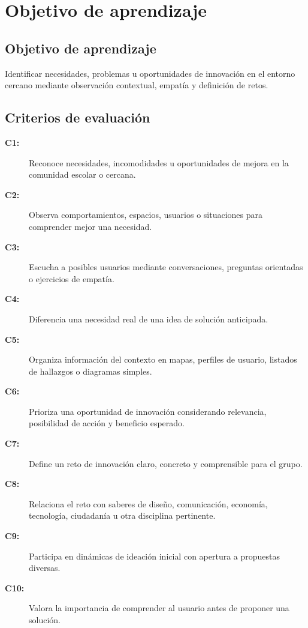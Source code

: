 \documentclass[12pt,a4paper]{article}
\newcommand{\criterio}[2]{
	\item[\textbf{#1:}] #2
}
\begin{document}
	
	\section{Objetivo de aprendizaje}
	
	\subsection*{Objetivo de aprendizaje}
	
	Identificar necesidades, problemas u oportunidades de innovación en el entorno cercano mediante observación contextual, empatía y definición de retos.
	
	\subsection*{Criterios de evaluación}
	
	\begin{description}
		
		\criterio{C1}{
			Reconoce necesidades, incomodidades u oportunidades de mejora
			en la comunidad escolar o cercana.
		}
		
		\criterio{C2}{
			Observa comportamientos, espacios, usuarios o situaciones para
			comprender mejor una necesidad.
		}
		
		\criterio{C3}{
			Escucha a posibles usuarios mediante conversaciones, preguntas
			orientadas o ejercicios de empatía.
		}
		
		\criterio{C4}{
			Diferencia una necesidad real de una idea de solución anticipada.
		}
		
		\criterio{C5}{
			Organiza información del contexto en mapas, perfiles de usuario,
			listados de hallazgos o diagramas simples.
		}
		
		\criterio{C6}{
			Prioriza una oportunidad de innovación considerando relevancia,
			posibilidad de acción y beneficio esperado.
		}
		
		\criterio{C7}{
			Define un reto de innovación claro, concreto y comprensible
			para el grupo.
		}
		
		\criterio{C8}{
			Relaciona el reto con saberes de diseño, comunicación, economía,
			tecnología, ciudadanía u otra disciplina pertinente.
		}
		
		\criterio{C9}{
			Participa en dinámicas de ideación inicial con apertura a
			propuestas diversas.
		}
		
		\criterio{C10}{
			Valora la importancia de comprender al usuario antes de
			proponer una solución.
		}
		
	\end{description}
	
\end{document}
